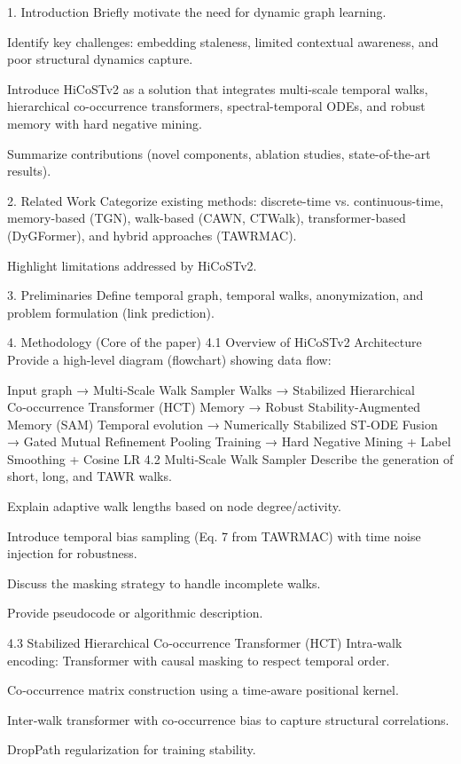 \documentclass{report}
\begin{document}
1. Introduction
Briefly motivate the need for dynamic graph learning.

Identify key challenges: embedding staleness, limited contextual awareness, and poor structural dynamics capture.

Introduce HiCoSTv2 as a solution that integrates multi-scale temporal walks, hierarchical co-occurrence transformers, spectral-temporal ODEs, and robust memory with hard negative mining.

Summarize contributions (novel components, ablation studies, state-of-the-art results).

2. Related Work
Categorize existing methods: discrete-time vs. continuous-time, memory-based (TGN), walk-based (CAWN, CTWalk), transformer-based (DyGFormer), and hybrid approaches (TAWRMAC).

Highlight limitations addressed by HiCoSTv2.

3. Preliminaries
Define temporal graph, temporal walks, anonymization, and problem formulation (link prediction).

4. Methodology (Core of the paper)
4.1 Overview of HiCoSTv2 Architecture
Provide a high-level diagram (flowchart) showing data flow:

Input graph → Multi‑Scale Walk Sampler
Walks → Stabilized Hierarchical Co‑occurrence Transformer (HCT)
Memory → Robust Stability‑Augmented Memory (SAM)
Temporal evolution → Numerically Stabilized ST‑ODE
Fusion → Gated Mutual Refinement Pooling
Training → Hard Negative Mining + Label Smoothing + Cosine LR
4.2 Multi‑Scale Walk Sampler
Describe the generation of short, long, and TAWR walks.

Explain adaptive walk lengths based on node degree/activity.

Introduce temporal bias sampling (Eq. 7 from TAWRMAC) with time noise injection for robustness.

Discuss the masking strategy to handle incomplete walks.

Provide pseudocode or algorithmic description.

4.3 Stabilized Hierarchical Co‑occurrence Transformer (HCT)
Intra‑walk encoding: Transformer with causal masking to respect temporal order.

Co‑occurrence matrix construction using a time‑aware positional kernel.

Inter‑walk transformer with co‑occurrence bias to capture structural correlations.

DropPath regularization for training stability.
\end{document}
